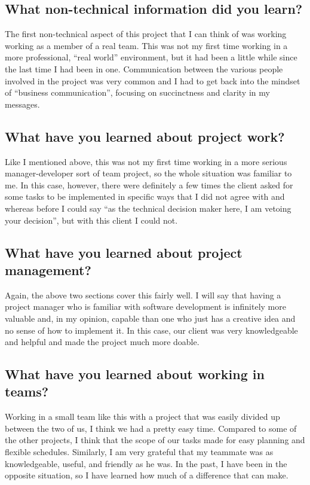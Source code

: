 \documentclass[11pt]{scrreprt}
\begin{document}
\subsection{What non-technical information did you learn?}

The first non-technical aspect of this project that I can think of was working working as a member of a real team.
This was not my first time working in a more professional, ``real world'' environment, but it had been a little while since the last time I had been in one.
Communication between the various people involved in the project was very common and I had to get back into the mindset of ``business communication'', focusing on succinctness and clarity in my messages.

\subsection{What have you learned about project work?}

Like I mentioned above, this was not my first time working in a more serious manager-developer sort of team project, so the whole situation was familiar to me.
In this case, however, there were definitely a few times the client asked for some tasks to be implemented in specific ways that I did not agree with and whereas before I could say ``as the technical decision maker here, I am vetoing your decision'', but with this client I could not.

\subsection{What have you learned about project management?}

Again, the above two sections cover this fairly well.
I will say that having a project manager who is familiar with software development is infinitely more valuable and, in my opinion, capable than one who just has a creative idea and no sense of how to implement it.
In this case, our client was very knowledgeable and helpful and made the project much more doable.

\subsection{What have you learned about working in teams?}

Working in a small team like this with a project that was easily divided up between the two of us, I think we had a pretty easy time.
Compared to some of the other projects, I think that the scope of our tasks made for easy planning and flexible schedules.
Similarly, I am very grateful that my teammate was as knowledgeable, useful, and friendly as he was.
In the past, I have been in the opposite situation, so I have learned how much of a difference that can make.
\end{document}
